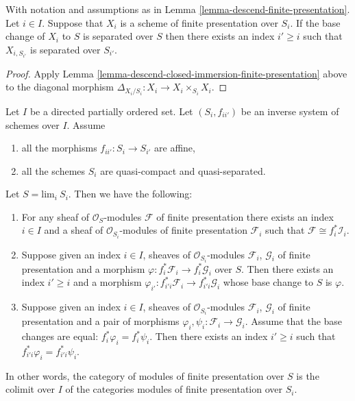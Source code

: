 \begin{lemma}
\label{lemma-descend-separated-finite-presentation}
With notation and assumptions as in
Lemma \ref{lemma-descend-finite-presentation}.
Let $i \in I$.
Suppose that $X_i$ is a scheme
of finite presentation over $S_i$.
If the base change of $X_i$ to $S$ is separated over $S$
then there exists an index $i' \geq i$ such that
$X_{i, S_{i'}}$ is separated over $S_{i'}$.
\end{lemma}

\begin{proof}
Apply Lemma \ref{lemma-descend-closed-immersion-finite-presentation} above
to the diagonal morphism $\Delta_{X_i/S_i} : X_i \to X_i \times_{S_i} X_i$.
\end{proof}







\begin{lemma}
\label{lemma-descend-modules-finite-presentation}
Let $I$ be a directed partially ordered set.
Let $(S_i, f_{ii'})$ be an inverse system of schemes over $I$.
Assume
\begin{enumerate}
\item all the morphisms $f_{ii'} : S_i \to S_{i'}$ are affine,
\item all the schemes $S_i$ are quasi-compact and quasi-separated.
\end{enumerate}
Let $S = \text{lim}_i\ S_i$. Then we have the following:
\begin{enumerate}
\item For any sheaf of $\mathcal{O}_S$-modules
$\mathcal{F}$ of finite presentation there exists an index
$i \in I$ and a sheaf of $\mathcal{O}_{S_i}$-modules of finite
presentation $\mathcal{F}_i$ such that
$\mathcal{F} \cong f_i^*\mathcal{I}_i$.
\item Suppose given an index $i \in I$, sheaves
of $\mathcal{O}_{S_i}$-modules $\mathcal{F}_i$, $\mathcal{G}_i$
of finite presentation and a morphism
$\varphi : f_i^*\mathcal{F}_i \to f_i^*\mathcal{G}_i$ over $S$.
Then there exists an index $i' \geq i$ and a morphism
$\varphi_{i'} : f_{i'i}^*\mathcal{F}_i \to f_{i'i}^*\mathcal{G}_i$
whose base change to $S$ is $\varphi$.
\item Suppose given an index $i \in I$, sheaves of $\mathcal{O}_{S_i}$-modules
$\mathcal{F}_i$, $\mathcal{G}_i$ of finite presentation
and a pair of morphisms $\varphi_i, \psi_i : \mathcal{F}_i \to \mathcal{G}_i$.
Assume that the base changes are equal: $f_i^*\varphi_i = f_i^*\psi_i$.
Then there exists an index $i' \geq i$ such that
$f_{i'i}^*\varphi_i = f_{i'i}^*\psi_i$.
\end{enumerate}
In other words, the category of modules
of finite presentation over $S$ is the colimit over $I$
of the categories modules of finite presentation over $S_i$.
\end{lemma}

